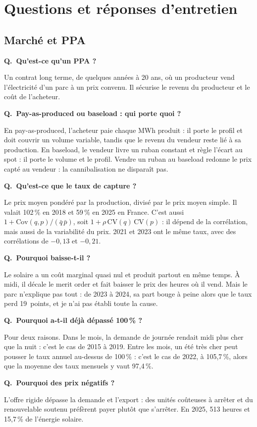 \documentclass[11pt,a4paper]{article}
\newcommand{\Cov}{\mathrm{Cov}}
\newcounter{qr}
\newcommand{\qr}[2]{\stepcounter{qr}\par\medskip\noindent\textbf{Q\theqr.\ #1}\par\nopagebreak\noindent #2\par}
\begin{document}
\section{Questions et réponses d'entretien}

\subsection{Marché et PPA}

\qr{Qu'est-ce qu'un PPA ?}{Un contrat long terme, de quelques années à 20 ans, où un producteur vend l'électricité d'un parc à un prix convenu. Il sécurise le revenu du producteur et le coût de l'acheteur.}

\qr{Pay-as-produced ou baseload : qui porte quoi ?}{En pay-as-produced, l'acheteur paie chaque MWh produit : il porte le profil et doit couvrir un volume variable, tandis que le revenu du vendeur reste lié à sa production. En baseload, le vendeur livre un ruban constant et règle l'écart au spot : il porte le volume et le profil. Vendre un ruban au baseload redonne le prix capté au vendeur : la cannibalisation ne disparaît pas.}

\qr{Qu'est-ce que le taux de capture ?}{Le prix moyen pondéré par la production, divisé par le prix moyen simple. Il valait 102\,\% en 2018 et 59\,\% en 2025 en France. C'est aussi $1 + \Cov(q,p)/(\bar q\,\bar p)$, soit $1 + \rho\,\mathrm{CV}(q)\,\mathrm{CV}(p)$ : il dépend de la corrélation, mais aussi de la variabilité du prix. 2021 et 2023 ont le même taux, avec des corrélations de $-0{,}13$ et $-0{,}21$.}

\qr{Pourquoi baisse-t-il ?}{Le solaire a un coût marginal quasi nul et produit partout en même temps. À midi, il décale le merit order et fait baisser le prix des heures où il vend. Mais le parc n'explique pas tout : de 2023 à 2024, sa part bouge à peine alors que le taux perd 19~points, et je n'ai pas établi toute la cause.}

\qr{Pourquoi a-t-il déjà dépassé 100\,\% ?}{Pour deux raisons. Dans le mois, la demande de journée rendait midi plus cher que la nuit : c'est le cas de 2015 à 2019. Entre les mois, un été très cher peut pousser le taux annuel au-dessus de 100\,\% : c'est le cas de 2022, à 105,7\,\%, alors que la moyenne des taux mensuels y vaut 97,4\,\%.}

\qr{Pourquoi des prix négatifs ?}{L'offre rigide dépasse la demande et l'export : des unités coûteuses à arrêter et du renouvelable soutenu préfèrent payer plutôt que s'arrêter. En 2025, 513 heures et 15,7\,\% de l'énergie solaire.}
\end{document}

